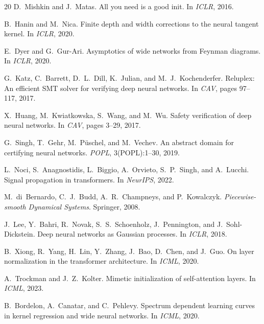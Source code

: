 \documentclass[10pt]{article}
\begin{document}
\begin{thebibliography}{20}
D.~Mishkin and J.~Matas.
\newblock All you need is a good init.
\newblock In \emph{ICLR}, 2016.

B.~Hanin and M.~Nica.
\newblock Finite depth and width corrections to the neural tangent kernel.
\newblock In \emph{ICLR}, 2020.

E.~Dyer and G.~Gur-Ari.
\newblock Asymptotics of wide networks from {F}eynman diagrams.
\newblock In \emph{ICLR}, 2020.

G.~Katz, C.~Barrett, D.~L.~Dill, K.~Julian, and M.~J.~Kochenderfer.
\newblock Reluplex: An efficient {SMT} solver for verifying deep neural networks.
\newblock In \emph{CAV}, pages 97--117, 2017.

X.~Huang, M.~Kwiatkowska, S.~Wang, and M.~Wu.
\newblock Safety verification of deep neural networks.
\newblock In \emph{CAV}, pages 3--29, 2017.

G.~Singh, T.~Gehr, M.~P{\"u}schel, and M.~Vechev.
\newblock An abstract domain for certifying neural networks.
\newblock \emph{POPL}, 3(POPL):1--30, 2019.

L.~Noci, S.~Anagnostidis, L.~Biggio, A.~Orvieto, S.~P.~Singh, and A.~Lucchi.
\newblock Signal propagation in transformers.
\newblock In \emph{NeurIPS}, 2022.

M.~di~Bernardo, C.~J.~Budd, A.~R.~Champneys, and P.~Kowalczyk.
\newblock \emph{Piecewise-smooth Dynamical Systems}.
\newblock Springer, 2008.

J.~Lee, Y.~Bahri, R.~Novak, S.~S.~Schoenholz, J.~Pennington, and J.~Sohl-Dickstein.
\newblock Deep neural networks as {G}aussian processes.
\newblock In \emph{ICLR}, 2018.

B.~Xiong, R.~Yang, H.~Lin, Y.~Zhang, J.~Bao, D.~Chen, and J.~Guo.
\newblock On layer normalization in the transformer architecture.
\newblock In \emph{ICML}, 2020.

A.~Trockman and J.~Z.~Kolter.
\newblock Mimetic initialization of self-attention layers.
\newblock In \emph{ICML}, 2023.

B.~Bordelon, A.~Canatar, and C.~Pehlevy.
\newblock Spectrum dependent learning curves in kernel regression and wide neural networks.
\newblock In \emph{ICML}, 2020.

\end{thebibliography}
\end{document}
